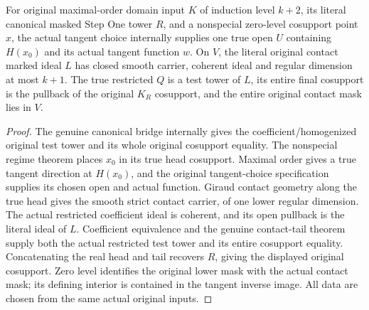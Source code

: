 \begin{theorem}
\label{hir:original-all-level-chosen-contact-coherent-model}
\leanok
{}
For original maximal-order domain input $K$ of induction level $k+2$, its
literal canonical masked Step One tower $R$, and a nonspecial zero-level
cosupport point $x$, the actual tangent choice internally supplies one true
open $U$ containing $H(x_0)$ and its actual tangent function $w$. On $V$, the
literal original contact marked ideal $L$ has closed smooth carrier, coherent
ideal and regular dimension at most $k+1$. The true restricted $Q$ is a test
tower of $L$, its entire final cosupport is the pullback of the original
$K_R$ cosupport, and the entire original contact mask lies in $V$.
\end{theorem}
\begin{proof}
The genuine canonical bridge internally gives the coefficient/homogenized
original test tower and its whole original cosupport equality. The nonspecial
regime theorem places $x_0$ in its true head cosupport. Maximal order gives a
true tangent direction at $H(x_0)$, and the original tangent-choice specification
supplies its chosen open and actual function. Giraud contact geometry along the
true head gives the smooth strict contact carrier, of one lower regular
dimension. The actual restricted coefficient ideal is coherent, and its open
pullback is the literal ideal of $L$. Coefficient equivalence and the genuine
contact-tail theorem supply both the actual restricted test tower and its entire
cosupport equality. Concatenating the real head and tail recovers $R$, giving
the displayed original cosupport. Zero level identifies the original lower mask
with the actual contact mask; its defining interior is contained in the tangent
inverse image. All data are chosen from the same actual original inputs.
\end{proof}

